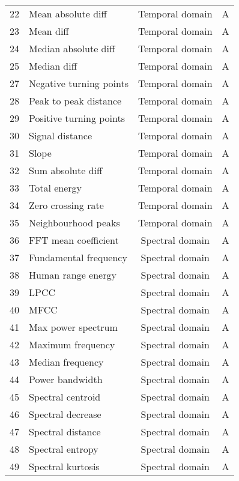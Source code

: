 \begin{tabularx}{\linewidth}{@{}rlcc@{}}
  22 & Mean absolute diff         & Temporal domain  & A\\
  23 & Mean diff         & Temporal domain  & A\\
  24 & Median absolute diff         & Temporal domain  & A\\
  25 & Median diff         & Temporal domain  & A\\
  27 & Negative turning points         & Temporal domain  & A\\
  28 & Peak to peak distance         & Temporal domain  & A\\
  29 & Positive turning points         & Temporal domain  & A\\
  30 & Signal distance         & Temporal domain  & A\\
  31 & Slope         & Temporal domain  & A\\
  32 & Sum absolute diff         & Temporal domain  & A\\
  33 & Total energy         & Temporal domain  & A\\
  34 & Zero crossing rate         & Temporal domain  & A\\
  35 & Neighbourhood peaks         & Temporal domain  & A\\
  36 & FFT mean coefficient         & Spectral domain  & A\\
  37 & Fundamental frequency         & Spectral domain  & A\\
  38 & Human range energy         & Spectral domain  & A\\
  39 & LPCC         & Spectral domain  & A\\
  40 & MFCC         & Spectral domain  & A\\
  41 & Max power spectrum         & Spectral domain  & A\\
  42 & Maximum frequency         & Spectral domain  & A\\
  43 & Median frequency         & Spectral domain  & A\\
  44 & Power bandwidth         & Spectral domain  & A\\
  45 & Spectral centroid         & Spectral domain  & A\\
  46 & Spectral decrease         & Spectral domain  & A\\
  47 & Spectral distance         & Spectral domain  & A\\
  48 & Spectral entropy         & Spectral domain  & A\\
  49 & Spectral kurtosis         & Spectral domain  & A\\

\end{tabularx}

